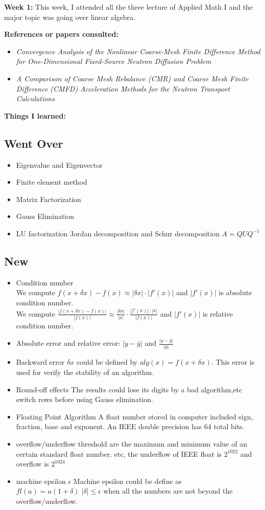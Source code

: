 \documentclass{article}
\begin{document}
\textbf{Week 1:}
This week, I attended all the three lecture of Applied Math I and the major topic was going over linear algebra.

\textbf{References or papers consulted:}
\begin{itemize}

\item {\em Convergence Analysis of the Nonlinear Coarse-Mesh Finite Difference Method for One-Dimensional Fixed-Source Neutron Diffusion Problem}
\item {\em A Comparison of Coarse Mesh Rebalance (CMR) and Coarse Mesh Finite Difference (CMFD) Acceleration Methods for the Neutron Transport Calculations}
\end{itemize}

\textbf{Things I learned:}
\subsection*{Went Over}
\begin{itemize}
\item Eigenvalue and Eigenvector
\item Finite element method
\item Matrix Factorization
\item Gauss Elimination 
\item LU factorization Jordan decomposition and Schur decomposition $A = QUQ^{-1}$
\end{itemize}
\subsection*{New}
\begin{itemize}
\item Condition number\\
We compute $f(x+\delta x)-f(x) \approx |\delta x|\cdot |f'(x)|$ and $|f'(x)|$ is absolute condition number.\\
We compute $\frac{|f(x+\delta x)-f(x)|}{|f(x)|}  \approx \frac{|\delta x|}{|x| }\cdot \frac{|f'(x)| \cdot |x|}{|f(x)|}$ and $|f'(x)|$ is relative condition number.
\item Absolute error and relative error: $|y-\bar y|$ and $\frac{|y-\bar y|}{|y|}$
\item Backward error $\delta x$ could be defined by $alg(x) = f(x + \delta x)$. This error is used for verify the stability of an algorithm. 
\item Round-off effects The results could lose its digits by a bad algorithm,etc switch rows before using Gauss elimination.
\item Floating Point Algorithm
A float number stored in computer included sign, fraction, base and exponent. An IEEE double precision has 64 total bits. 
\item overflow/underflow threshold are the maximum and minimum value of an certain standard float number. etc, the underflow of IEEE float is $2^{1022}$ and overflow is $2^1024$
\item machine epsilon $\epsilon$ 
Machine epsilon could be define as $ fl(a) = a(1+ \delta ) \; | \delta | \leq \epsilon $ when all the numbers are not beyond the overflow/underflow.

\end{itemize}
\end{document}
